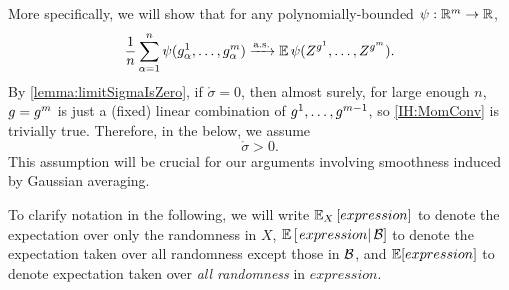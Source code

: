 \documentclass[main.tex]{subfiles}
\begin{document}
More specifically,
we will show that for any polynomially-bounded $\psi: \mathbb{R}^{m} \to \mathbb{R}$,
\begin{align*}
    \frac{1}{n} \sum_{\alpha=1}^n \psi(g^1_\alpha, \ldots, g^{m}_\alpha) 
    \xrightarrow{\mathrm{a.s.}}
    \operatorname*{\mathbb{E}} \psi(Z^{g^1}, \ldots, Z^{g^m})
    .
\end{align*}
By \cref{lemma:limitSigmaIsZero}, if $\mathring \sigma = 0$, then almost surely, for large enough $n$, $g = g^m$ is just a (fixed) linear combination of $g^1, \ldots, g^{m-1}$, so \ref{IH:MomConv} is trivially true.
Therefore, in the below, we assume 
\begin{equation}
\mathring \sigma > 0.
\label{assm:mathringSigmaPositive}
\tag{$\star$}
\end{equation}
This assumption will be crucial for our arguments involving smoothness induced by Gaussian averaging.

\newcommand{\probA}{\mathsf{A}}
\newcommand{\probB}{\mathsf{B}}
\newcommand{\probC}{\mathsf{C}}
\newcommand{\probD}{\mathsf{D}}

\newcommand{\EVbr}[2][]{\EV_{#1}\left[#2\right]}
\newcommand{\EVcond}[2]{\EV\left[\left.#1\right| #2 \right]}
\newcommand{\extcom}[1]{{\color{blue}{#1}}}
\newcommand{\exttcom}[1]{{\color{olive}{#1}}}

To clarify notation in the following, we will write $\EVbr[X]{expression}$ to denote the expectation over only the randomness in $X$, $\EVcond{expression}{\Bb}$ to denote the expectation taken over all randomness except those in $\mathcal{B}$, and $\operatorname*{\mathbb{E}}[expression]$ to denote expectation taken over \emph{all randomness} in $expression$.
\end{document}
